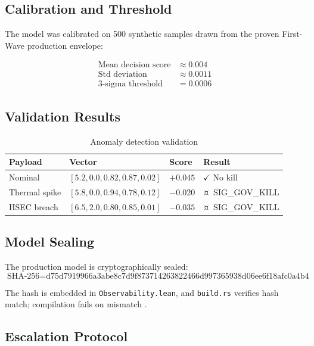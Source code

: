 \documentclass[11pt,a4paper]{article}
\theoremstyle{plain}
\begin{document}
\subsection{Calibration and Threshold}

The model was calibrated on 500 synthetic samples drawn from the proven First-Wave production envelope:

\begin{align}
    \text{Mean decision score} &\approx 0.004 \\
    \text{Std deviation} &\approx 0.0011 \\
    \text{3-sigma threshold} &= 0.0006
\end{align}

\subsection{Validation Results}

\begin{table}[h]
\centering
\begin{tabular}{llll}
\toprule
\textbf{Payload} & \textbf{Vector} & \textbf{Score} & \textbf{Result} \\
\midrule
Nominal & $[5.2, 0.0, 0.82, 0.87, 0.02]$ & $+0.045$ & $\checkmark$ No kill \\
Thermal spike & $[5.8, 0.0, 0.94, 0.78, 0.12]$ & $-0.020$ & $\text{\textcurrency}$ SIG\_GOV\_KILL \\
HSEC breach & $[6.5, 2.0, 0.80, 0.85, 0.01]$ & $-0.035$ & $\text{\textcurrency}$ SIG\_GOV\_KILL \\
\bottomrule
\end{tabular}
\caption{Anomaly detection validation}
\label{tab:anomalyValidation}
\end{table}

\subsection{Model Sealing}

The production model is cryptographically sealed:
\begin{equation}
    \text{SHA-256} = \text{d75d7919966a3abe8c7d9f873714263822466d997365938d06ee6f18afc0a4b4}
\end{equation}

The hash is embedded in \texttt{Observability.lean}, and \texttt{build.rs} verifies hash match; compilation fails on mismatch \cite{leanObservability}.

\subsection{Escalation Protocol}
\end{document}
